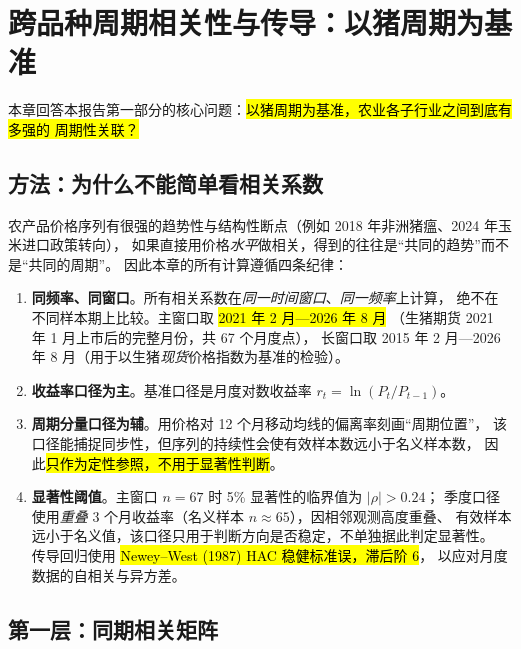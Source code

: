 \section{跨品种周期相关性与传导：以猪周期为基准}
\label{sec:corr}

本章回答本报告第一部分的核心问题：\hl{以猪周期为基准，农业各子行业之间到底有多强的
周期性关联？}

\subsection{方法：为什么不能简单看相关系数}
\label{sec:corr-method}

农产品价格序列有很强的趋势性与结构性断点（例如 2018 年非洲猪瘟、2024 年玉米进口政策转向），
如果直接用价格\emph{水平}做相关，得到的往往是“共同的趋势”而不是“共同的周期”。
因此本章的所有计算遵循四条纪律：

\begin{enumerate}
  \item \textbf{同频率、同窗口}。所有相关系数在\emph{同一时间窗口}、\emph{同一频率}上计算，
  绝不在不同样本期上比较。主窗口取 \hl{2021 年 2 月---2026 年 8 月}
  （生猪期货 2021 年 1 月上市后的完整月份，共 67 个月度点），
  长窗口取 2015 年 2 月---2026 年 8 月（用于以生猪\emph{现货}价格指数为基准的检验）。
  \item \textbf{收益率口径为主}。基准口径是月度对数收益率
  $r_t=\ln(P_t/P_{t-1})$。
  \item \textbf{周期分量口径为辅}。用价格对 12 个月移动均线的偏离率刻画“周期位置”，
  该口径能捕捉同步性，但序列的持续性会使有效样本数远小于名义样本数，
  因此\hl{只作为定性参照，不用于显著性判断}。
  \item \textbf{显著性阈值}。主窗口 $n=67$ 时 5\% 显著性的临界值为 $|\rho|>0.24$；
  季度口径使用\emph{重叠} 3 个月收益率（名义样本 $n\approx 65$），因相邻观测高度重叠、
  有效样本远小于名义值，该口径只用于判断方向是否稳定，不单独据此判定显著性。
  传导回归使用 \hl{Newey--West (1987) HAC 稳健标准误，滞后阶 6}，
  以应对月度数据的自相关与异方差。
\end{enumerate}

\subsection{第一层：同期相关矩阵}
\label{sec:corr-matrix}

